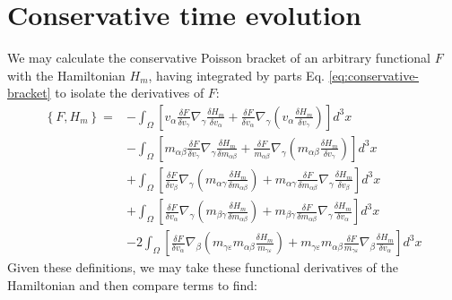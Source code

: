\documentclass[reqno]{article}
\begin{document}
  \section{Conservative time evolution}
  We may calculate the conservative Poisson bracket of an arbitrary functional
  $F$ with the Hamiltonian $H_m$, having integrated by parts Eq.
  \eqref{eq:conservative-bracket} to isolate the derivatives of $F$:
  \begin{equation}
    \begin{split}
      \left\{ F, H_m \right\}
      =
      &- \int_\Omega \left[
        v_\alpha \frac{\delta F}{\delta v_\gamma} \nabla_\gamma \frac{\delta H_m}{\delta v_\alpha}
        + \frac{\delta F}{\delta v_\alpha} \nabla_\gamma \left( v_\alpha\frac{\delta H_m}{\delta v_\gamma} \right)
      \right] d^3 x \\
      &- \int_\Omega \left[
        m_{\alpha \beta} \frac{\delta F}{\delta v_\gamma} \nabla_\gamma \frac{\delta H_m}{\delta m_{\alpha\beta}}
        + \frac{\delta F}{m_{\alpha\beta}} \nabla_\gamma \left( m_{\alpha\beta} \frac{\delta H_m}{\delta v_\gamma} \right)
      \right] d^3 x \\
      &+ \int_\Omega \left[
        \frac{\delta F}{\delta v_\beta} \nabla_\gamma \left( m_{\alpha\gamma} \frac{\delta H_m}{\delta m_{\alpha\beta}}\right)
        + m_{\alpha\gamma}\frac{\delta F}{\delta m_{\alpha\beta}} \nabla_\gamma \frac{\delta H_m}{\delta v_\beta}
      \right] d^3 x \\
      &+ \int_\Omega  \left[
        \frac{\delta F}{\delta v_\alpha} \nabla_\gamma \left( m_{\beta\gamma} \frac{\delta H_m}{\delta m_{\alpha\beta}}\right)
        + m_{\beta\gamma} \frac{\delta F}{\delta m_{\alpha\beta}} \nabla_\gamma \frac{\delta H_m}{\delta v_\alpha}
      \right] d^3 x \\
      &- 2 \int_\Omega  \left[
        \frac{\delta F}{\delta v_\alpha} \nabla_\beta \left( m_{\gamma\varepsilon} m_{\alpha\beta}\frac{\delta H_m}{m_{\gamma\varepsilon}}\right)
        + m_{\gamma\varepsilon} m_{\alpha\beta} \frac{\delta F}{m_{\gamma\varepsilon}} \nabla_\beta \frac{\delta H_m}{\delta v_\alpha}
      \right] d^3 x
    \end{split}
  \end{equation}
  Given these definitions, we may take these functional derivatives of the
  Hamiltonian and then compare terms to find:
\end{document}
